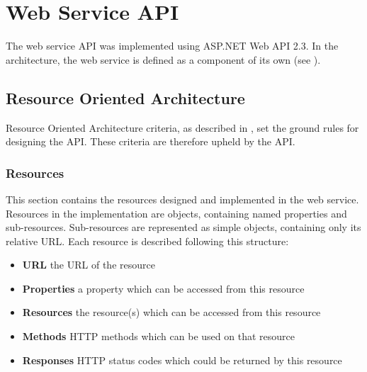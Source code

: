 \section{Web Service API}\label{design:web_service}
The web service API was implemented using ASP.NET Web API 2.3\cite{aspnet_webapi}.
In the architecture, the web service is defined as a component of its own (see ).

\subsection{Resource Oriented Architecture}
Resource Oriented Architecture criteria, as described in , set the ground rules for designing the API.
These criteria are therefore upheld by the API.

\subsubsection{Resources}\label{webservice:resources}
This section contains the resources designed and implemented in the web service.
Resources in the implementation are objects, containing named properties and sub-resources.
Sub-resources are represented as simple objects, containing only its relative URL.
Each resource is described following this structure:
\begin{itemize}
\item \textbf{URL} the URL of the resource
\item \textbf{Properties} a property which can be accessed from this resource
\item \textbf{Resources} the resource(s) which can be accessed from this resource
\item \textbf{Methods} HTTP methods which can be used on that resource
\item \textbf{Responses} HTTP status codes which could be returned by this resource
\end{itemize}

